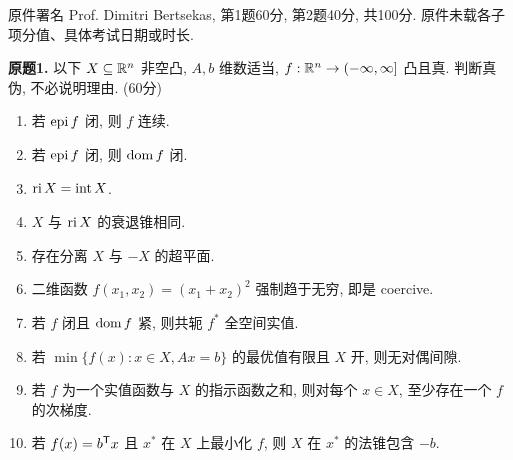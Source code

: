 原件署名 Prof. Dimitri Bertsekas, 第1题60分, 第2题40分, 共100分. 原件未载各子项分值、具体考试日期或时长.

\begin{exercise}\label{ass:6253-exam2012-q1}
\textbf{原题1.} 以下 $X\subseteq\mathbb R^n$ 非空凸, $A,b$ 维数适当, $f:\mathbb R^n\to(-\infty,\infty]$ 凸且真. 判断真伪, 不必说明理由. (60分)
\begin{enumerate}[label=(\arabic*)]
\item 若 $\operatorname{epi} f$ 闭, 则 $f$ 连续.
\item 若 $\operatorname{epi} f$ 闭, 则 $\operatorname{dom} f$ 闭.
\item $\operatorname{ri} X=\operatorname{int}X$.
\item $X$ 与 $\operatorname{ri} X$ 的衰退锥相同.
\item 存在分离 $X$ 与 $-X$ 的超平面.
\item 二维函数 $f(x_1,x_2)=(x_1+x_2)^2$ 强制趋于无穷, 即是 coercive.
\item 若 $f$ 闭且 $\operatorname{dom} f$ 紧, 则共轭 $f^*$ 全空间实值.
\item 若 $\min\{f(x):x\in X,Ax=b\}$ 的最优值有限且 $X$ 开, 则无对偶间隙.
\item 若 $f$ 为一个实值函数与 $X$ 的指示函数之和, 则对每个 $x\in X$, 至少存在一个 $f$ 的次梯度.
\item 若 $f(x)=b^{\mathsf T} x$ 且 $x^*$ 在 $X$ 上最小化 $f$, 则 $X$ 在 $x^*$ 的法锥包含 $-b$.
\end{enumerate}
\end{exercise}

